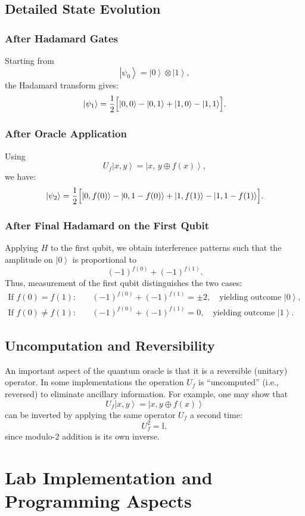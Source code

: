 \documentclass[11pt,oneside]{book}
\theoremstyle{remark}
\renewcommand{\ket}[1]{\left|#1\right\rangle}
\begin{document}
	\section{Detailed State Evolution}
	\subsection*{After Hadamard Gates}
	Starting from
	\[
	\ket{\psi_0}=\ket{0}\otimes\ket{1},
	\]
	the Hadamard transform gives:
	\[
	\ket{\psi_1}=\frac{1}{2}\Bigl[\ket{0,0}-\ket{0,1}+\ket{1,0}-\ket{1,1}\Bigr].
	\]
	
	\subsection*{After Oracle Application}
	Using
	\[
	U_f\ket{x,y}=\ket{x,\,y\oplus f(x)},
	\]
	we have:
	\[
	\ket{\psi_2}=\frac{1}{2}\Bigl[\ket{0,f(0)}-\ket{0,1-f(0)}+\ket{1,f(1)}-\ket{1,1-f(1)}\Bigr].
	\]
	
	\subsection*{After Final Hadamard on the First Qubit}
	Applying $H$ to the first qubit, we obtain interference patterns such that the amplitude on $\ket{0}$ is proportional to
	\[
	(-1)^{f(0)}+(-1)^{f(1)}.
	\]
	Thus, measurement of the first qubit distinguishes the two cases:
	\[
	\begin{aligned}
		\text{If } f(0)=f(1): &\quad (-1)^{f(0)}+(-1)^{f(1)}= \pm 2, \quad \text{yielding outcome } \ket{0},\\[1mm]
		\text{If } f(0)\neq f(1): &\quad (-1)^{f(0)}+(-1)^{f(1)}=0, \quad \text{yielding outcome } \ket{1}.
	\end{aligned}
	\]
	
	\section{Uncomputation and Reversibility}
	An important aspect of the quantum oracle is that it is a reversible (unitary) operator. In some implementations the operation $U_f$ is “uncomputed” (i.e., reversed) to eliminate ancillary information. For example, one may show that
	\[
	U_f\ket{x,y}=\ket{x,y\oplus f(x)}
	\]
	can be inverted by applying the same operator $U_f$ a second time:
	\[
	U_f^2=\mathbb{I},
	\]
	since modulo-$2$ addition is its own inverse.
	
	\chapter{Lab Implementation and Programming Aspects}
\end{document}
